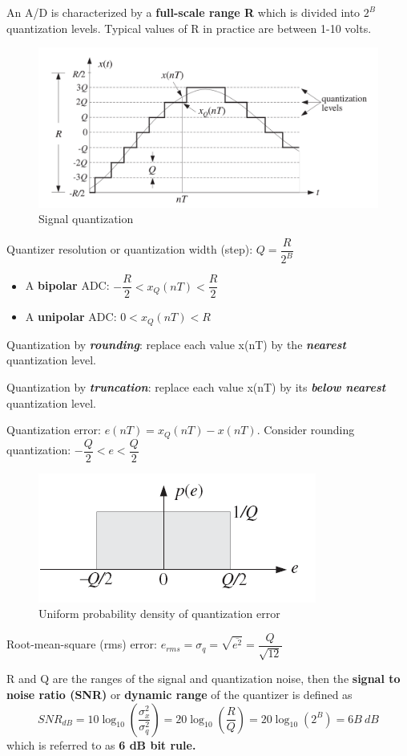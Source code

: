 \documentclass[11pt, a4paper]{article}
\begin{document}
An A/D is characterized by a \textbf{full-scale range R} which is divided into $2^B$ quantization levels. Typical values of R in practice are between 1-10 volts.
\begin{figure}[h!]
    \centering
    \includegraphics[width=0.5\linewidth]{img/18.png}
    \caption{Signal quantization}
\end{figure}

Quantizer resolution or quantization width (step): $Q = \dfrac{R}{2^B}$
\begin{itemize}
    \item A \textbf{bipolar} ADC: $-\dfrac{R}{2}<x_Q(nT)<\dfrac{R}{2}$
    \item A \textbf{unipolar} ADC: $0<x_Q(nT)<R$
\end{itemize}

Quantization by \textbf{\textit{rounding}}: replace each value x(nT) by the \textbf{\textit{nearest}} quantization level. 

Quantization by \textbf{\textit{truncation}}: replace each value x(nT) by its \textbf{\textit{below nearest}} quantization level.

Quantization error: $e(nT) = x_Q (nT) - x(nT)$. Consider rounding quantization: $-\dfrac{Q}{2}<e<\dfrac{Q}{2}$
\begin{figure}[h!]
    \centering
    \includegraphics[width=0.3\linewidth]{img/19.png}
    \caption{Uniform probability density of quantization error}
\end{figure}

Root-mean-square (rms) error: $e_{rms}=\sigma_q=\sqrt{\overline{e^2}}=\dfrac{Q}{\sqrt{12}}$

R and Q are the ranges of the signal and quantization noise, then the \textbf{signal to noise ratio (SNR)} or \textbf{dynamic range} of the quantizer is defined as
\begin{equation*}
    SNR_{dB} = 10\log_{10}\left(\frac{\sigma^2_x}{\sigma^2_q}\right)=20\log_{10}\left(\frac{R}{Q}\right)=20\log_{10}(2^B)=6B\ dB
\end{equation*}
which is referred to as \textbf{6 dB bit rule.}
\end{document}
